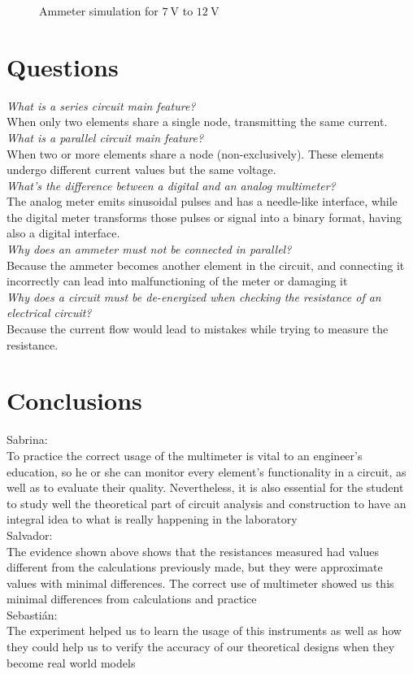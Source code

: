 \documentclass[a4paper]{article}
\begin{document}
\begin{figure}[H]
\begin{subfigure}{0.48\textwidth}
\end{subfigure}
\caption{Ammeter simulation for $\SI{7}{\volt}$ to $\SI{12}{\volt}$}
\label{fig:5}
\end{figure}
\newpage
\section{Questions}
\textit{What is a series circuit main feature?}\\
When only two elements share a single node, transmitting the same current. 
\textit{What is a parallel circuit main feature?}\\
When two or more elements share a node (non-exclusively). These elements undergo different current values but the same voltage.\\
\textit{What’s the difference between a digital and an analog multimeter?}\\
The analog meter emits sinusoidal pulses and has a needle-like interface, while the digital meter transforms those pulses or signal into a binary format, having also a digital interface.\\
\textit{Why does an ammeter must not be connected in parallel?}\\
Because the ammeter becomes another element in the circuit, and connecting it incorrectly can lead into malfunctioning of the meter or damaging it\\
\textit{Why does a circuit must be de-energized when checking the resistance of an electrical circuit?}\\
Because the current flow would lead to mistakes while trying to measure the resistance. 
\section{Conclusions}
{\large Sabrina:}\\[2ex] 
To practice the correct usage of the multimeter is vital to an engineer’s education, so he or she can monitor every element’s functionality in a circuit, as well as to evaluate their quality. Nevertheless, it is also essential for the student to study well the theoretical part of circuit analysis and construction to have an integral idea to what is really happening in the laboratory\\[2ex] 
{\large Salvador:}\\[2ex]
The evidence shown above shows that the resistances measured had values different from the calculations previously made, but they were approximate values with minimal differences. The correct use of multimeter showed us this minimal differences from calculations and practice\\[2ex]
{\large Sebastián:}\\[2ex]
The experiment helped us to learn the usage of this instruments as well as how they could help us to verify the accuracy of our theoretical designs when they become real world models
\end{document}
